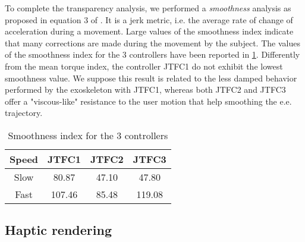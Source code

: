 \par To complete the transparency analysis, we performed a \emph{smoothness} analysis as proposed in equation 3 of \cite{jarrasse2010methodology}. It is a jerk metric, i.e. the average rate of change of acceleration during a movement. Large values of the smoothness index indicate that many corrections are made during the movement by the subject. 
The values of the smoothness index for the 3 controllers have been reported in \tablename{} \ref{tab:jerkTransparency}.
Differently from the mean torque index, the controller JTFC1 do not exhibit the lowest smoothness value. We suppose this result is related to the less damped behavior performed by the exoskeleton with JTFC1, whereas both JTFC2 and JTFC3 offer a "viscous-like" resistance to the user motion that help smoothing the e.e. trajectory.

\begin{table}[b]
	\renewcommand{\arraystretch}{1.3}
	\caption{Smoothness index for the 3 controllers}
	\label{tab:jerkTransparency}
	\centering
	\begin{tabular}{c c c c}
		\hline \hline
		\bfseries Speed & \bfseries JTFC1 & \bfseries JTFC2 & \bfseries JTFC3 \\
		\hline
		Slow  &  80.87 & 47.10 & 47.80\\ 
		Fast & 107.46  & 85.48 & 119.08 \\
		\hline \hline
	\end{tabular}
\end{table}
\subsection{Haptic rendering}

